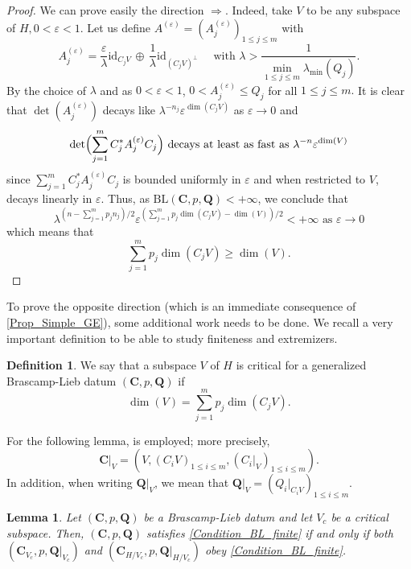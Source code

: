 \documentclass[11pt,a4paper,reqno]{amsart}
\numberwithin{equation}{section}
\newtheorem{lemma}[theorem]{Lemma}
\theoremstyle{definition}
\newtheorem{definition}[theorem]{Definition}
\newcommand{\<}{\ensuremath \leq}
\renewcommand{\>}{\ensuremath \geq}
\renewcommand{\epsilon}{\varepsilon}
\begin{document}
\begin{proof}
    We can prove easily the direction $\Longrightarrow.$ Indeed, take $V$ to be any subspace of $H, 0<\epsilon<1.$ Let us define $A^{(\epsilon)}=(A^{(\epsilon)}_j)_{1 \leq j \leq m}$ with $$A_j^{(\epsilon)}=\frac{\epsilon}{\lambda}\mathrm{id}_{C_jV} \, \oplus \, \frac{1}{\lambda}\mathrm{id}_{(C_jV)^{\perp}} \quad \text{ with } \lambda>\frac{1}{\min_{1 \leq j \leq m}\lambda_{\text{min}}(Q_j)}.$$ By the choice of $\lambda$ and as $0<\epsilon<1$, $0<A_j^{(\epsilon)} \leq Q_j$ for all $1 \leq j \leq m.$ It is clear that $\det(A_j^{(\epsilon)})$ decays like $\lambda^{-n_j}\epsilon^{\dim(C_jV)}$ as $\epsilon \rightarrow 0$ and $$\det \Bigl(\sum_{j=1}^m C_j^* A_j^{(\epsilon)}C_j \Bigl) \text{ decays at least as fast as } \lambda^{-n}\epsilon^{\dim(V)}$$ since $\sum_{j=1}^m C_j^*A_j^{(\epsilon)}C_j$ is bounded uniformly in $\epsilon$ and when restricted to $V$, decays linearly in $\epsilon$. Thus, as $\mathrm{BL}(\textbf{C},p,\textbf{Q})<+\infty$, we conclude that $$\lambda^{(n-\sum_{j=1}^m p_jn_j)/2}\epsilon^{(\sum_{j=1}^m p_j \dim(C_jV)-\dim(V))/2}<+\infty \text{ as } \epsilon \rightarrow 0$$ which means that $$\sum_{j=1}^m p_j\dim(C_jV) \geq \dim(V).$$
\end{proof}

To prove the opposite direction (which is an immediate consequence of \cref{Prop_Simple_GE}), some additional work needs to be done. We recall a very important definition to be able to study finiteness and extremizers.
 
\begin{definition}
We say that a subspace $V$ of $H$ is critical for a generalized Brascamp-Lieb datum $(\textbf{C},p,\textbf{Q})$  if $$\dim(V)=\sum_{j=1}^m p_j \dim(C_jV).$$
\end{definition}

For the following lemma, \cite[Definition 4.2]{BCCT} is employed; more precisely, $$\mathbf{C}|_V=(V,(C_iV)_{1 \le i \le m},(C_i|_V)_{1 \le i \le m}).$$ In addition, when writing $\textbf{Q}|_V$, we mean that $\textbf{Q}|_V=(Q_i|_{C_iV})_{1 \leq i \leq m}.$ 

\begin{lemma}
    Let $(\textbf{C},p,\textbf{Q})$ be a Brascamp-Lieb datum and let $V_c$ be a critical subspace. Then, $(\textbf{C},p,\textbf{Q})$ satisfies \cref{Condition_BL_finite} if and only if both $(\textbf{C}_{V_c},p,\textbf{Q}|_{V_c})$ and $(\textbf{C}_{H/V_c},p,\textbf{Q}|_{H/V_c})$ obey \cref{Condition_BL_finite}. 
\end{lemma}
\end{document}
